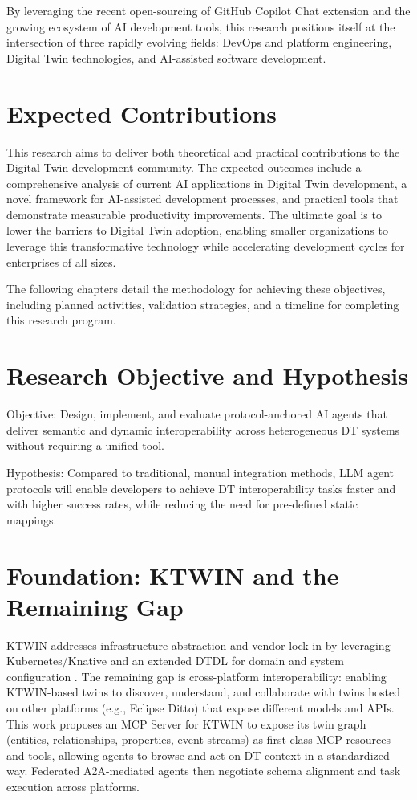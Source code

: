 By leveraging the recent open-sourcing of GitHub Copilot Chat extension and the growing ecosystem of AI development tools, this research positions itself at the intersection of three rapidly evolving fields: DevOps and platform engineering, Digital Twin technologies, and AI-assisted software development.

\section{Expected Contributions}

This research aims to deliver both theoretical and practical contributions to the Digital Twin development community. The expected outcomes include a comprehensive analysis of current AI applications in Digital Twin development, a novel framework for AI-assisted development processes, and practical tools that demonstrate measurable productivity improvements. The ultimate goal is to lower the barriers to Digital Twin adoption, enabling smaller organizations to leverage this transformative technology while accelerating development cycles for enterprises of all sizes.

The following chapters detail the methodology for achieving these objectives, including planned activities, validation strategies, and a timeline for completing this research program.






\section{Research Objective and Hypothesis}

Objective: Design, implement, and evaluate protocol-anchored AI agents that deliver semantic and dynamic interoperability across heterogeneous DT systems without requiring a unified tool.

Hypothesis: Compared to traditional, manual integration methods, LLM agent protocols will enable developers to achieve DT interoperability tasks faster and with higher success rates, while reducing the need for pre-defined static mappings.

\section{Foundation: KTWIN and the Remaining Gap}

KTWIN addresses infrastructure abstraction and vendor lock-in by leveraging Kubernetes/Knative and an extended DTDL for domain and system configuration \cite{Wermann_Wickboldt_2025}. The remaining gap is cross-platform interoperability: enabling KTWIN-based twins to discover, understand, and collaborate with twins hosted on other platforms (e.g., Eclipse Ditto) that expose different models and APIs. This work proposes an MCP Server for KTWIN to expose its twin graph (entities, relationships, properties, event streams) as first-class MCP resources and tools, allowing agents to browse and act on DT context in a standardized way. Federated A2A-mediated agents then negotiate schema alignment and task execution across platforms.

